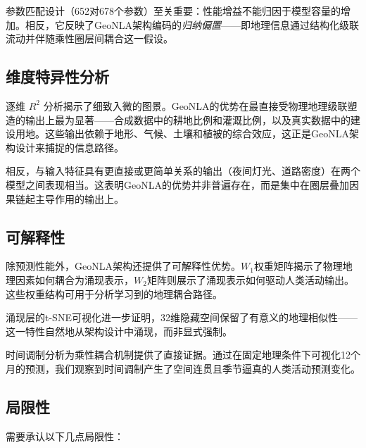 \documentclass[a4paper,11pt]{article}
\begin{document}
参数匹配设计（652对678个参数）至关重要：性能增益不能归因于模型容量的增加。相反，它反映了GeoNLA架构编码的\emph{归纳偏置}——即地理信息通过结构化级联流动并伴随乘性圈层间耦合这一假设。

\subsection{维度特异性分析}
\label{subsec:dim_analysis}

逐维 $R^2$ 分析揭示了细致入微的图景。GeoNLA的优势在最直接受物理地理级联塑造的输出上最为显著——合成数据中的耕地比例和灌溉比例，以及真实数据中的建设用地。这些输出依赖于地形、气候、土壤和植被的综合效应，这正是GeoNLA架构设计来捕捉的信息路径。

相反，与输入特征具有更直接或更简单关系的输出（夜间灯光、道路密度）在两个模型之间表现相当。这表明GeoNLA的优势并非普遍存在，而是集中在圈层叠加因果链起主导作用的输出上。

\subsection{可解释性}
\label{subsec:interpretability}

除预测性能外，GeoNLA架构还提供了可解释性优势。$W_1$权重矩阵揭示了物理地理因素如何耦合为涌现表示，$W_2$矩阵则展示了涌现表示如何驱动人类活动输出。这些权重结构可用于分析学习到的地理耦合路径。

涌现层的t-SNE可视化进一步证明，32维隐藏空间保留了有意义的地理相似性——这一特性自然地从架构设计中涌现，而非显式强制。

时间调制分析为乘性耦合机制提供了直接证据。通过在固定地理条件下可视化12个月的预测，我们观察到时间调制产生了空间连贯且季节逼真的人类活动预测变化。

\subsection{局限性}
\label{subsec:limitations}

需要承认以下几点局限性：
\end{document}
